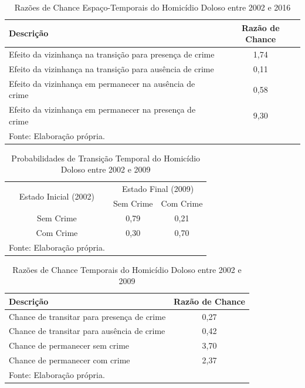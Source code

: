 \documentclass[12pt,openright,oneside,a4paper,english,french,spanish]{abntex2}
\numberwithin{table}{section} %
\numberwithin{figure}{section} %
\begin{document}
\begin{subappendices}
\begin{table}[H]
\centering
\caption{Razões de Chance Espaço-Temporais do Homicídio Doloso entre 2002 e 2016}
        \begin{tabular}{lc}
            \hline
            {\textbf{Descrição}} & {\textbf{Razão de Chance}} \\\hline
            {Efeito da vizinhança na transição para presença de crime} & {1,74} \\
            {Efeito da vizinhança na transição para ausência de crime} & {0,11} \\
            {Efeito da vizinhança em permanecer na ausência de crime} & {0,58} \\
            {Efeito da vizinhança em permanecer na presença de crime} & {9,30} \\\hline
            \tiny Fonte: Elaboração própria.
        \end{tabular}
    \label{tab:odds_espaco_tempo_hom_dol_2002_2016}
\end{table}










\begin{table}[H]
\centering
\caption{Probabilidades de Transição Temporal do Homicídio Doloso entre 2002 e 2009}
        \begin{tabular}{ccc}
            \hline
            \multirow{2}{*}{Estado Inicial (2002)} & \multicolumn{2}{c}{Estado Final (2009)}  \\\cline{2-3} 
                                     & \multicolumn{1}{l}{Sem Crime} & \multicolumn{1}{l}{Com Crime} \\\hline
            {Sem Crime} & {0,79} & {0,21} \\                \hline
            {Com Crime} & {0,30} & {0,70} \\                \hline
            \tiny Fonte: Elaboração própria.
        \end{tabular}
    \label{tab:prob_tempo_hom_dol_2002_2009}
\end{table}

\begin{table}[H]
\centering
\caption{Razões de Chance Temporais do Homicídio Doloso entre 2002 e 2009}
        \begin{tabular}{lc}
            \hline
            {\textbf{Descrição}} & {\textbf{Razão de Chance}} \\\hline
            {Chance de transitar para presença de crime} & {0,27} \\
            {Chance de transitar para ausência de crime} & {0,42} \\
            {Chance de permanecer sem crime} & {3,70} \\
            {Chance de permanecer com crime} & {2,37} \\\hline
            \tiny Fonte: Elaboração própria.
        \end{tabular}
    \label{tab:odds_tempo_hom_dol_2002_2009}
\end{table}



\end{subappendices}
\end{document}
